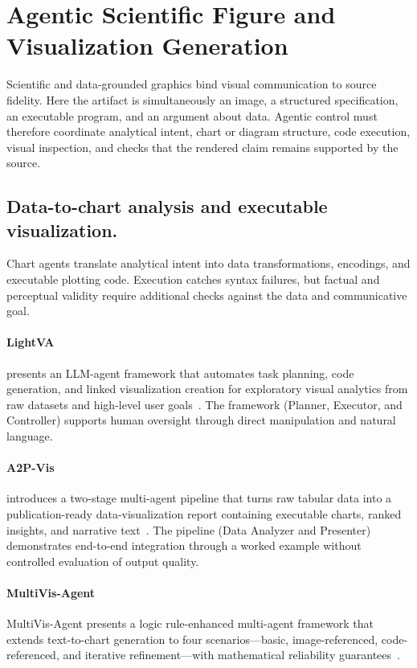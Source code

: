 \section{Agentic Scientific Figure and Visualization Generation}
\label{sec:scientific-visualization}

Scientific and data-grounded graphics bind visual communication to source fidelity. Here the artifact is simultaneously an image, a structured specification, an executable program, and an argument about data. Agentic control must therefore coordinate analytical intent, chart or diagram structure, code execution, visual inspection, and checks that the rendered claim remains supported by the source.

\subsection{Data-to-chart analysis and executable visualization.}
Chart agents translate analytical intent into data transformations, encodings, and executable plotting code. Execution catches syntax failures, but factual and perceptual validity require additional checks against the data and communicative goal.

\paragraph{LightVA}
 presents an LLM-agent framework that automates task planning, code generation, and linked visualization creation for exploratory visual analytics from raw datasets and high-level user goals~\cite{zhao2024lightva}. The framework (Planner, Executor, and Controller) supports human oversight through direct manipulation and natural language.

\paragraph{A2P-Vis}
 introduces a two-stage multi-agent pipeline that turns raw tabular data into a publication-ready data-visualization report containing executable charts, ranked insights, and narrative text~\cite{avg251222101}. The pipeline (Data Analyzer and Presenter) demonstrates end-to-end integration through a worked example without controlled evaluation of output quality.

\paragraph{MultiVis-Agent}
MultiVis-Agent presents a logic rule-enhanced multi-agent framework that extends text-to-chart generation to four scenarios—basic, image-referenced, code-referenced, and iterative refinement—with mathematical reliability guarantees~\cite{avg260118320}.

